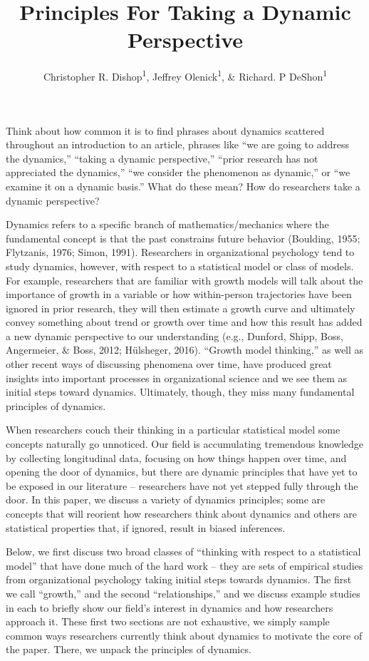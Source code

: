\documentclass[english,,man]{apa6}
\author{Christopher R. Dishop\textsuperscript{1}, Jeffrey Olenick\textsuperscript{1}, \& Richard. P DeShon\textsuperscript{1}}
\affiliation{
\vspace{0.5cm}
\textsuperscript{1} Michigan State University}
\title{Principles For Taking a Dynamic Perspective}
\date{}
\begin{document}
\maketitle

Think about how common it is to find phrases about dynamics scattered throughout an introduction to an article, phrases like \enquote{we are going to address the dynamics,} \enquote{taking a dynamic perspective,} \enquote{prior research has not appreciated the dynamics,} \enquote{we consider the phenomenon as dynamic,} or \enquote{we examine it on a dynamic basis.} What do these mean? How do researchers take a dynamic perspective?

Dynamics refers to a specific branch of mathematics/mechanics where the fundamental concept is that the past constrains future behavior (Boulding, 1955; Flytzanis, 1976; Simon, 1991). Researchers in organizational psychology tend to study dynamics, however, with respect to a statistical model or class of models. For example, researchers that are familiar with growth models will talk about the importance of growth in a variable or how within-person trajectories have been ignored in prior research, they will then estimate a growth curve and ultimately convey something about trend or growth over time and how this result has added a new dynamic perspective to our understanding (e.g., Dunford, Shipp, Boss, Angermeier, \& Boss, 2012; Hülsheger, 2016). \enquote{Growth model thinking,} as well as other recent ways of discussing phenomena over time, have produced great insights into important processes in organizational science and we see them as initial steps toward dynamics. Ultimately, though, they miss many fundamental principles of dynamics.

When researchers couch their thinking in a particular statistical model some concepts naturally go unnoticed. Our field is accumulating tremendous knowledge by collecting longitudinal data, focusing on how things happen over time, and opening the door of dynamics, but there are dynamic principles that have yet to be exposed in our literature -- researchers have not yet stepped fully through the door. In this paper, we discuss a variety of dynamics principles; some are concepts that will reorient how researchers think about dynamics and others are statistical properties that, if ignored, result in biased inferences.

Below, we first discuss two broad classes of \enquote{thinking with respect to a statistical model} that have done much of the hard work -- they are sets of empirical studies from organizational psychology taking initial steps towards dynamics. The first we call \enquote{growth,} and the second \enquote{relationships,} and we discuss example studies in each to briefly show our field's interest in dynamics and how researchers approach it. These first two sections are not exhaustive, we simply sample common ways researchers currently think about dynamics to motivate the core of the paper. There, we unpack the principles of dynamics.
\end{document}
